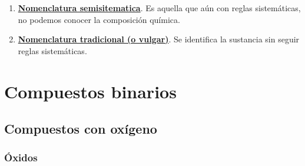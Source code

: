 \documentclass[11pt, a4paper]{article}
\begin{document}
\begin{enumerate}
\begin{enumerate}
\begin{enumerate}[label=\itembolascolor{\arabic*}{blue}]

                        \item \textbf{Números de oxidación de los elementos} Se indican con  números romanos.
                        \item \textbf{Número de carga de los iones} Se indican con números arábicos.
                    \end{enumerate}
              \item \textbf{Sustitución}. Está basada en la nomenclatura de hidruros no metálicos, que se nombran como hidrocarburos y empleando los sufijos necesarios. La IUPAC acepta los nombres tradicionales como agua () y amoniaco ()
          \end{enumerate}
    \item \textbf{\uline{Nomenclatura semisitematica}}. Es aquella que aún con reglas sistemáticas, no podemos conocer la composición química.
    \item \textbf{\uline{Nomenclatura tradicional (o vulgar)}}. Se identifica la sustancia sin seguir reglas sistemáticas.
\end{enumerate}


\section{Compuestos binarios}\label{sec:binarios}

\subsection{Compuestos con oxígeno}\label{sec:compuestos_oxigeno}

\subsubsection{Óxidos}\label{sec:oxidos}
\end{document}
